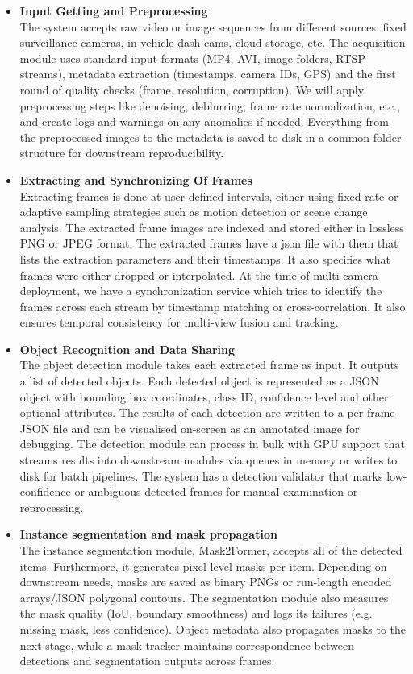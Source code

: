 \documentclass[12pt,a4paper]{report}
\theoremstyle{definition}
\theoremstyle{remark}
\begin{document}
\begin{itemize}
\item \textbf{Input Getting and Preprocessing}\\
The system accepts raw video or image sequences from different sources: fixed surveillance cameras, in-vehicle dash cams, cloud storage, etc. The acquisition module uses standard input formats (MP4, AVI, image folders, RTSP streams), metadata extraction (timestamps, camera IDs, GPS) and the first round of quality checks (frame, resolution, corruption). We will apply preprocessing steps like denoising, deblurring, frame rate normalization, etc., and create logs and warnings on any anomalies if needed. Everything from the preprocessed images to the metadata is saved to disk in a common folder structure for downstream reproducibility.

\item \textbf{Extracting and Synchronizing Of Frames} \\
Extracting frames is done at user-defined intervals, either using fixed-rate or adaptive sampling strategies such as motion detection or scene change analysis. The extracted frame images are indexed and stored either in  lossless PNG or JPEG format.  The extracted frames have a json file with them that lists the extraction parameters and their timestamps.  It also specifies what frames were either dropped or interpolated. At the time of multi-camera deployment, we have a synchronization service which tries to identify the frames across each stream by timestamp matching or cross-correlation. It also ensures temporal consistency for multi-view fusion and tracking.

\item \textbf{Object Recognition and Data Sharing}\\
The object detection module takes each extracted frame as input.  It outputs a list of detected objects. Each detected object is represented as a JSON object with bounding box coordinates, class ID, confidence level and other optional attributes. The results of each detection are written to a per-frame JSON file and can be visualised on-screen as an annotated image for debugging. The detection module can process in bulk with GPU support that streams results into downstream modules via queues in memory or writes to disk for batch pipelines. The system has a detection validator that marks low-confidence or ambiguous detected frames for manual examination or reprocessing.

\item \textbf{Instance segmentation and mask propagation}\\
The instance segmentation module, Mask2Former, accepts all of the detected items. Furthermore, it generates pixel-level masks per item. Depending on downstream needs, masks are saved as binary PNGs or run-length encoded arrays/JSON polygonal contours. The segmentation module also measures the mask quality (IoU, boundary smoothness) and logs its failures (e.g. missing mask, less confidence). Object metadata also propagates masks to the next stage, while a mask tracker maintains correspondence between detections and segmentation outputs across frames.


\end{itemize}
\end{document}
